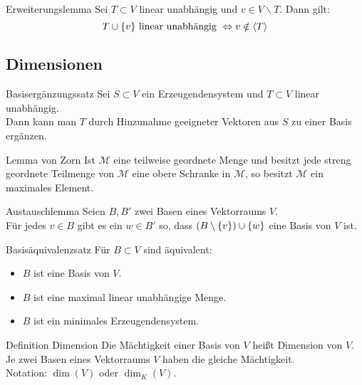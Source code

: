 \documentclass[main.tex]{subfiles}
\begin{document}
\begin{karte}{Erweiterungslemma}
    Sei \(T \subset V\) linear unabhängig und \(v \in V \backslash T \). Dann gilt: 
    \[T \cup \{v\} \text{ linear unabhängig } 
    \Leftrightarrow v \notin \langle T \rangle \]
\end{karte}
\subsection*{Dimensionen}
\begin{karte}{Basisergänzungssatz}
    Sei \(S \subset V\) ein Erzeugendensystem und \(T \subset V\)
    linear unabhängig. \\
    Dann kann man \(T\) durch Hinzunahme geeigneter Vektoren aus \(S\)
    zu einer Basis ergänzen.
\end{karte}
\begin{karte}{Lemma von Zorn}
    Ist \(\mathcal{M}\) eine teilweise geordnete Menge und besitzt
    jede streng geordnete Teilmenge von \(\mathcal{M}\) eine obere 
    Schranke in \(\mathcal{M}\), so besitzt \(\mathcal{M}\) 
    ein maximales Element.
\end{karte}
\begin{karte}{Austauschlemma}
    Seien \(B, B'\) zwei Basen eines Vektorraums \(V\). \\ 
    Für jedes \(v \in B \) gibt es ein \(w \in B'\) so, 
    dass \((B \setminus \{v\}) \cup \{w\}\) 
    eine Basis von \(V\) ist.
\end{karte}
\begin{karte}{Basisäquivalenzsatz} %
    Für \(B \subset V\) sind äquivalent: 
    \begin{itemize}
        \item \(B\) ist eine Basis von \(V\).
        \item \(B\) ist eine maximal linear unabhängige Menge.
        \item \(B\) ist ein minimales Erzeugendensystem.
    \end{itemize}
\end{karte}
\begin{karte}{Definition Dimension}
    Die Mächtigkeit einer Basis von \(V\) heißt Dimension von \(V\). \\ 
    Je zwei Basen eines Vektorraums \(V\) haben die gleiche Mächtigkeit. \\
    Notation: \( \dim(V) \) oder \( \dim_K(V) \).
\end{karte}
\end{document}
